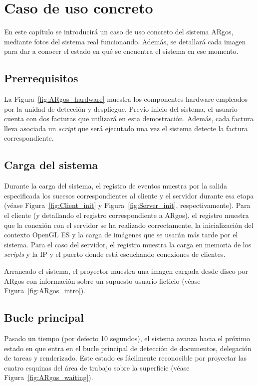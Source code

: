 \chapter{Caso de uso concreto}

En este capítulo se introducirá un caso de uso concreto del sistema ARgos, mediante fotos del
sistema real funcionando. Además, se detallará cada imagen para dar a conocer el estado en qué se
encuentra el sistema en ese momento.

\section{Prerrequisitos}

La Figura~\ref{fig:ARgos_hardware} muestra los componentes hardware empleados por la unidad de
detección y despliegue. Previo inicio del sistema, el usuario cuenta con dos facturas que utilizará
en esta demostración. Además, cada factura lleva asociada un \textit{script} que será ejecutado una
vez el sistema detecte la factura correspondiente.

\section{Carga del sistema}

Durante la carga del sistema, el registro de eventos muestra por la salida especificada los sucesos
correspondientes al cliente y el servidor durante esa etapa (véase Figura~\ref{fig:Client_init} y
Figura~\ref{fig:Server_init}, respectivamente). Para el cliente (y detallando el registro
correspondiente a ARgos), el registro muestra que la conexión con el servidor se ha realizado
correctamente, la inicialización del contexto OpenGL ES y la carga de imágenes que se usarán más
tarde por el sistema. Para el caso del servidor, el registro muestra la carga en memoria de los
\textit{scripts} y la IP y el puerto donde está escuchando conexiones de clientes.

Arrancado el sistema, el proyector muestra una imagen cargada desde disco por ARgos con
información sobre un supuesto usuario ficticio (véase Figura~\ref{fig:ARgos_intro}).

\section{Bucle principal}

Pasado un tiempo (por defecto 10 segundos), el sistema avanza hacia el próximo estado en que entra
en el bucle principal de detección de documentos, delegación de tareas y renderizado. Este estado es
fácilmente reconocible por proyectar las cuatro esquinas del área de trabajo sobre la superficie
(véase Figura~\ref{fig:ARgos_waiting}).

